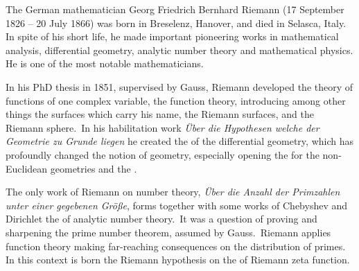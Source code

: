 \documentclass[12pt]{article}
\theoremstyle{definition}
\begin{document}
The German mathematician Georg Friedrich Bernhard Riemann (17 September 1826 -- 20 July 1866) was born in Breselenz, Hanover, and died in Selasca, Italy.\, In spite of his short life, he made important pioneering works in mathematical analysis, differential geometry, analytic number theory and mathematical physics.\, He is one of the most notable mathematicians.

In his PhD thesis in 1851, supervised by Gauss, Riemann developed the theory of functions of one complex variable, the function theory, introducing among other things the surfaces which carry his name, the Riemann surfaces, and the Riemann sphere.\, In his habilitation work {\em \"Uber die Hypothesen welche der Geometrie zu Grunde liegen} he created the  of the differential geometry, which has profoundly changed the notion of geometry, especially opening the  for the non-Euclidean geometries and the .

The only work of Riemann on number theory, {\em \"Uber die Anzahl der Primzahlen unter einer gegebenen Gr\"o\ss e}, forms together with some works of Chebyshev and Dirichlet the  of analytic number theory.\, It was a question of proving and sharpening the prime number theorem, assumed by Gauss.\, Riemann applies function theory making far-reaching consequences on the distribution of primes.\, In this context is born the Riemann hypothesis on the  of Riemann zeta function.
\end{document}
